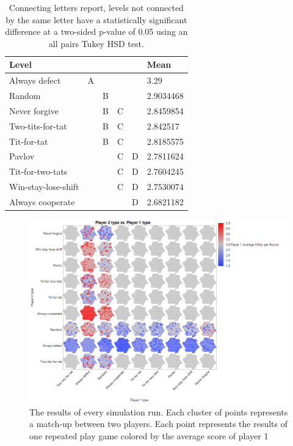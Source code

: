 \documentclass[a4paper]{article}
\begin{document}
\begin{table}[]
    \centering
\begin{tabular}{llllll}
\textbf{Level}      &   &   &   &   & \textbf{Mean} \\ \hline
Always defect       & A &   &   &   & 3.29          \\
Random              &   & B &   &   & 2.9034468     \\
Never forgive       &   & B & C &   & 2.8459854     \\
Two-tits-for-tat    &   & B & C &   & 2.842517      \\
Tit-for-tat         &   & B & C &   & 2.8185575     \\
Pavlov              &   &   & C & D & 2.7811624     \\
Tit-for-two-tats    &   &   & C & D & 2.7604245     \\
Win-stay-lose-shift &   &   & C & D & 2.7530074     \\
Always cooperate    &   &   &   & D & 2.6821182    
\end{tabular}
    \caption{Connecting letters report, levels not connected by the same letter have a statistically significant difference at a two-sided p-value of 0.05 using an all pairs Tukey HSD test.}
    \label{tab:connectingLetters}
\end{table}

\begin{figure}
    \centering
    \includegraphics[width=\textwidth]{images/allGames.png}
    \caption{The results of every simulation run. Each cluster of points represents a match-up between two players.  Each point represents the results of one repeated play game colored by the average score of player 1}
    \label{fig:allgames}
\end{figure}
\end{document}
